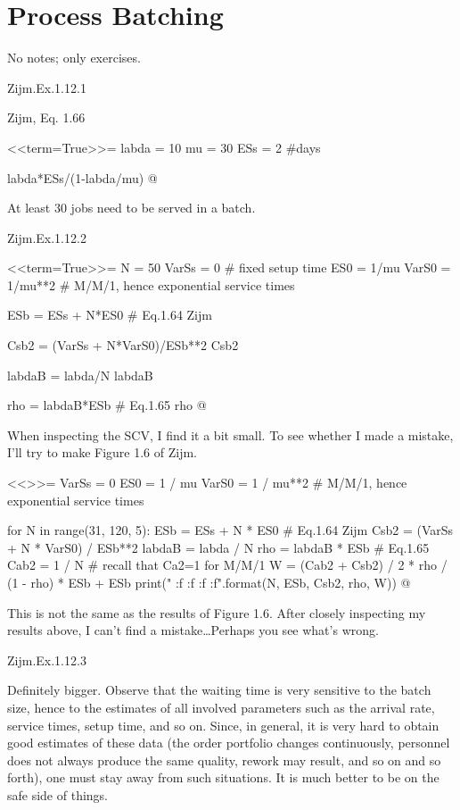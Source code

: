 \section{Process Batching}
\label{sec:process-batching}

No notes; only exercises.

\begin{exercise}
Zijm.Ex.1.12.1
 \begin{solution}
Zijm, Eq. 1.66

<<term=True>>=
labda = 10
mu = 30
ESs = 2 #days

labda*ESs/(1-labda/mu)
@

At least 30 jobs need to be served in a batch.
\end{solution}
\end{exercise}

\begin{exercise}
Zijm.Ex.1.12.2
 \begin{solution}

<<term=True>>=
N = 50
VarSs = 0 # fixed setup time
ES0 = 1/mu
VarS0 = 1/mu**2 # M/M/1, hence exponential service times

ESb = ESs + N*ES0 # Eq.1.64 Zijm

Csb2 = (VarSs + N*VarS0)/ESb**2 
Csb2

labdaB = labda/N
labdaB


rho = labdaB*ESb # Eq.1.65
rho 
@

When inspecting the SCV, I find it a bit small. To see whether I made a mistake, I'll try to make Figure 1.6 of Zijm.

<<>>=
VarSs = 0
ES0 = 1 / mu
VarS0 = 1 / mu**2  # M/M/1, hence exponential service times

for N in range(31, 120, 5):
    ESb = ESs + N * ES0  # Eq.1.64 Zijm
    Csb2 = (VarSs + N * VarS0) / ESb**2
    labdaB = labda / N
    rho = labdaB * ESb  # Eq.1.65
    Cab2 = 1 / N  # recall that Ca2=1 for M/M/1
    W = (Cab2 + Csb2) / 2 * rho / (1 - rho) * ESb + ESb
    print("{} {:f} {:f} {:f} {:f}".format(N, ESb, Csb2, rho, W))
@

This is not the same as the results of Figure 1.6. After closely
inspecting my results above, I can't find a mistake\ldots Perhaps you see what's wrong.

\end{solution}
\end{exercise}

\begin{exercise}
Zijm.Ex.1.12.3
 \begin{solution}
   Definitely bigger. Observe that the waiting time is very sensitive
   to the batch size, hence to the estimates of all involved
   parameters such as the arrival rate, service times, setup time, and
   so on. Since, in general, it is very hard to obtain good estimates
   of these data (the order portfolio changes continuously, personnel
   does not always produce the same quality, rework may result, and so
   on and so forth), one must stay away from such situations. It is
   much better to be on the safe side of things.
\end{solution}
\end{exercise}




